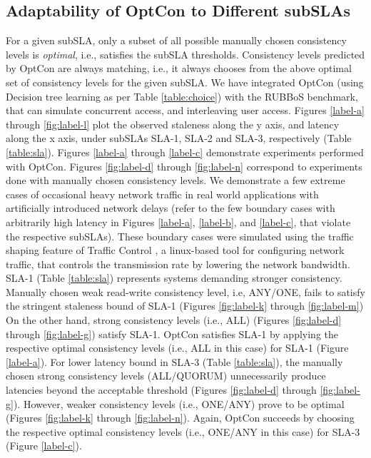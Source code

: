 \documentclass[conference]{IEEEtran}
\begin{document}
\subsection{Adaptability  of OptCon to Different subSLAs}\label{sec:user}For a given subSLA, only a subset of all possible manually chosen consistency levels is \emph{optimal}, i.e., satisfies the subSLA thresholds. Consistency levels predicted by OptCon are always matching, i.e., it always chooses from the above optimal set of consistency levels for the given subSLA. We have integrated OptCon (using Decision tree learning as per Table \ref{table:choice})
with the RUBBoS \cite{objWeb-RUBBoS} benchmark, that can simulate concurrent access, and interleaving user access. Figures \ref{label-a} through \ref{fig:label-l} plot the observed staleness along the y axis, and latency along the x axis, under subSLAs SLA-1, SLA-2 and SLA-3, respectively (Table \ref{table:sla}). Figures \ref{label-a} through \ref{label-c} demonstrate experiments performed with OptCon. Figures \ref{fig:label-d} through \ref{fig:label-n} correspond to experiments done with manually chosen consistency levels.
 We demonstrate a few extreme cases of occasional heavy network traffic in real
world applications with artificially introduced network delays (refer to the few boundary cases with arbitrarily high latency in Figures
\ref{label-a}, \ref{label-b}, and \ref{label-c}, that violate the respective subSLAs). These boundary cases were simulated using the traffic shaping feature of Traffic Control \cite{2004lartc_howto}, a linux-based
tool for configuring network traffic, that controls the transmission rate by lowering the network
 bandwidth.
 SLA-1 (Table \ref{table:sla}) represents systems demanding stronger consistency. Manually chosen weak read-write consistency level, i.e, ANY/ONE, fails to satisfy the stringent staleness bound of SLA-1 (Figures \ref{fig:label-k} through \ref{fig:label-m})  On the other hand, strong consistency levels (i.e., ALL) (Figures
\ref{fig:label-d}  through \ref{fig:label-g}) satisfy SLA-1. OptCon satisfies SLA-1 by applying the respective optimal consistency levels (i.e., ALL in this case) for SLA-1 (Figure \ref{label-a}). For lower latency bound in SLA-3 (Table \ref{table:sla}), the manually chosen strong consistency levels (ALL/QUORUM) unnecessarily produce latencies beyond the acceptable threshold (Figures
\ref{fig:label-d}  through \ref{fig:label-g}). However, weaker consistency levels (i.e., ONE/ANY) prove to be optimal (Figures \ref{fig:label-k} through \ref{fig:label-n}). Again, OptCon  succeeds by choosing the respective optimal consistency levels (i.e., ONE/ANY in this case) for SLA-3 (Figure \ref{label-c}).
\end{document}
